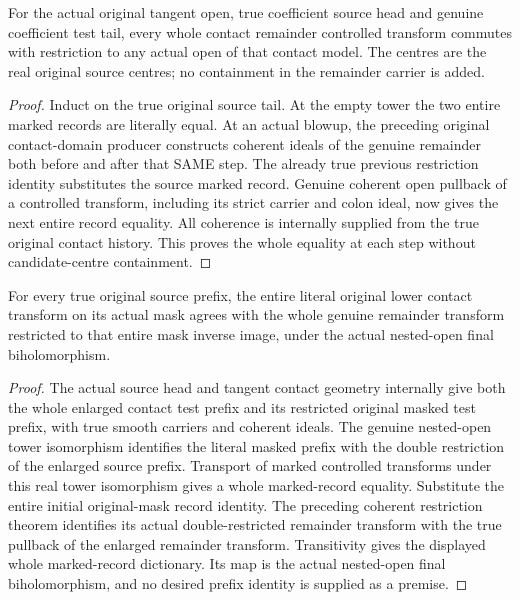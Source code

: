 \begin{lemma}
\label{hir:original-all-level-contact-remainder-open-transform-dictionary}
\leanok
{}
For the actual original tangent open, true coefficient source head and genuine
coefficient test tail, every whole contact remainder controlled transform
commutes with restriction to any actual open of that contact model. The
centres are the real original source centres; no containment in the remainder
carrier is added.
\end{lemma}
\begin{proof}
Induct on the true original source tail. At the empty tower the two entire
marked records are literally equal. At an actual blowup, the preceding
original contact-domain producer constructs coherent ideals of the genuine
remainder both before and after that SAME step. The already true previous
restriction identity substitutes the source marked record. Genuine coherent
open pullback of a controlled transform, including its strict carrier and
colon ideal, now gives the next entire record equality. All coherence is
internally supplied from the true original contact history. This proves the
whole equality at each step without candidate-centre containment.
\end{proof}

\begin{theorem}
\label{hir:original-all-level-contact-remainder-nested-prefix-dictionary}
\leanok
{}
For every true original source prefix, the entire literal original lower
contact transform on its actual mask agrees with the whole genuine remainder
transform restricted to that entire mask inverse image, under the actual
nested-open final biholomorphism.
\end{theorem}
\begin{proof}
The actual source head and tangent contact geometry internally give both the
whole enlarged contact test prefix and its restricted original masked test
prefix, with true smooth carriers and coherent ideals. The genuine nested-open
tower isomorphism identifies the literal masked prefix with the double
restriction of the enlarged source prefix. Transport of marked controlled
transforms under this real tower isomorphism gives a whole marked-record
equality. Substitute the entire initial original-mask record identity. The
preceding coherent restriction theorem identifies its actual double-restricted
remainder transform with the true pullback of the enlarged remainder transform.
Transitivity gives the displayed whole marked-record dictionary. Its map is
the actual nested-open final biholomorphism, and no desired prefix identity is
supplied as a premise.
\end{proof}

